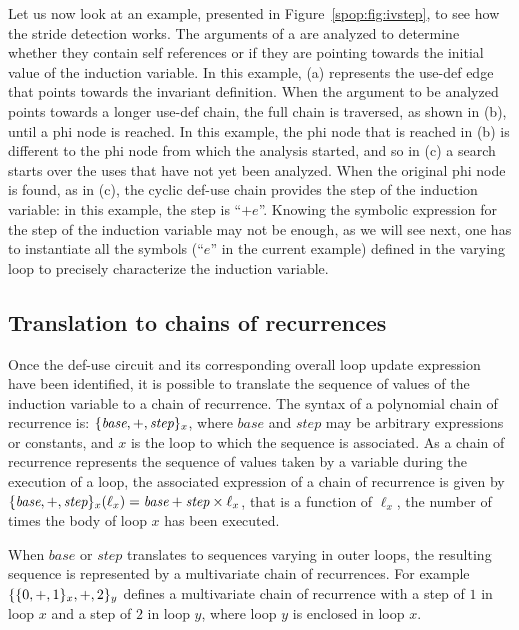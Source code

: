 {Let us now look at an example, presented in Figure~\ref{spop:fig:ivstep}, to see how the stride detection works. 
The arguments of a \phinode are analyzed to determine whether they contain self references or if they are pointing towards the initial value of the induction variable. 
In this example, (a) represents the use-def edge that points towards the invariant definition. 
When the argument to be analyzed points towards a longer use-def chain, the full chain is traversed, as shown in (b), until a phi node is reached. 
In this example, the phi node that is reached in (b) is different to the phi node from which the analysis started, and so in (c) a search starts over the uses that have not yet been analyzed. 
When the original phi node is found, as in (c), the cyclic def-use chain provides the step of the induction variable: 
in this example, the step is ``$+ e$''. 
Knowing the symbolic expression for the step of the induction variable may not be enough, as we will see next, one has to instantiate all the symbols (``$e$'' in the current example) defined in the varying loop to precisely characterize the induction variable.

\subsection{Translation to chains of recurrences}
{
\def\step{\textit{step}\xspace}
\def\base{\textit{base}\xspace}
Once the def-use circuit and its corresponding overall loop update expression have been identified, it is possible to translate the sequence of values of the induction variable to a chain of recurrence. 
The syntax of a polynomial chain of recurrence is: 
$\CHREC{\base, +, \step}_x$, where $\base$ and $\step$ may be arbitrary expressions or constants, and $x$ is the loop to which the sequence is associated. 
As a chain of recurrence represents the sequence of values taken by a variable during the execution of a loop, the associated expression of a chain of recurrence is given by $\CHREC{\base, +, \step}_x (\ell_x) = \base + \step \times \ell_x$, that is a function of $\ell_x$, the number of times the body of loop $x$ has been executed.

When $\base$ or $\step$ translates to sequences varying in outer loops, the resulting sequence is represented by a multivariate chain of recurrences. 
For example $\{\{0, +, 1\}_x, +, 2\}_y$ defines a multivariate chain of recurrence with a step of $1$ in loop $x$ and a step of $2$ in loop $y$, where loop $y$ is enclosed in loop $x$.

}}
